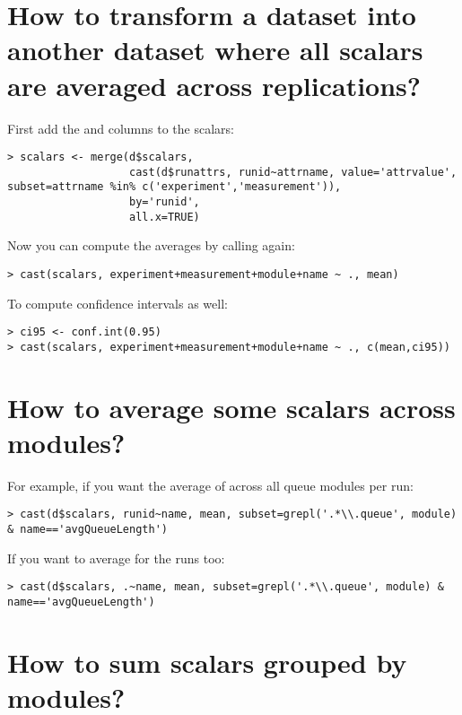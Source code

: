 \section{How to transform a dataset into another dataset where all scalars are averaged across replications?}

First add the  and  columns to the scalars:

\begin{verbatim}
> scalars <- merge(d$scalars,
                   cast(d$runattrs, runid~attrname, value='attrvalue', subset=attrname %in% c('experiment','measurement')),
                   by='runid',
                   all.x=TRUE)
\end{verbatim}

Now you can compute the averages by calling  again:

\begin{verbatim}
> cast(scalars, experiment+measurement+module+name ~ ., mean)
\end{verbatim}

To compute confidence intervals as well:

\begin{verbatim}
> ci95 <- conf.int(0.95)
> cast(scalars, experiment+measurement+module+name ~ ., c(mean,ci95))
\end{verbatim}

\section{How to average some scalars across modules?}

For example, if you want the average of  across all queue modules per run:

\begin{verbatim}
> cast(d$scalars, runid~name, mean, subset=grepl('.*\\.queue', module) & name=='avgQueueLength')
\end{verbatim}

If you want to average for the runs too:

\begin{verbatim}
> cast(d$scalars, .~name, mean, subset=grepl('.*\\.queue', module) & name=='avgQueueLength')
\end{verbatim}

\section{How to sum scalars grouped by modules?}

